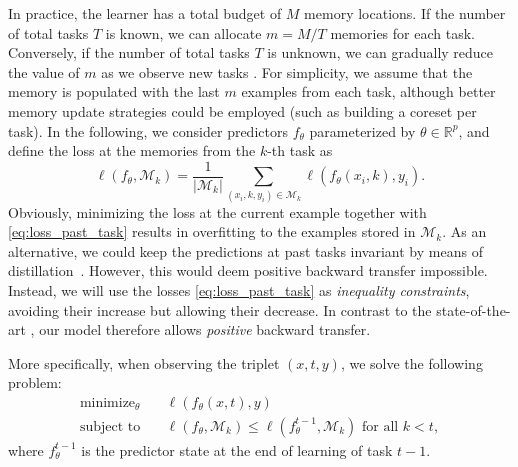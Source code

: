 \documentclass{article}
\begin{document}
In practice, the learner has a total budget of $M$ memory locations.  If the
number of total tasks $T$ is known, we can allocate $m=M/T$ memories for each
task.  Conversely, if the number of total tasks $T$ is unknown, we can
gradually reduce the value of $m$ as we observe new tasks \citep{icarl}.  For
simplicity, we assume that the memory is populated with the last $m$ examples
from each task, although better memory update strategies could be employed
(such as building a coreset per task).  In the following, we consider
predictors $f_\theta$ parameterized by $\theta \in \mathbb{R}^p$, and define
the loss at the memories from the $k$-th task as
\begin{equation}
  \ell(f_\theta, \mathcal{M}_k) = \frac{1}{|\mathcal{M}_k|} \sum_{(x_i, k, y_i)
  \in \mathcal{M}_k} \ell(f_\theta(x_i, k), y_i). \label{eq:loss_past_task}
\end{equation}
Obviously, minimizing the loss at the current example together with
\eqref{eq:loss_past_task} results in overfitting to the examples stored in
$\mathcal{M}_k$.  As an alternative, we could keep the predictions at past
tasks invariant by means of distillation~\citep{icarl}.  However, this would
deem positive backward transfer impossible.  Instead, we will use the losses
\eqref{eq:loss_past_task} as {\em inequality constraints}, avoiding their
increase but allowing their decrease.  In contrast to the state-of-the-art
\citep{ewc, icarl}, our model therefore allows \textit{positive} backward
transfer.

More specifically, when observing the triplet $(x, t, y)$, we solve the
following problem:
\begin{align}
\text{minimize}_\theta\quad& \ell(f_\theta(x,t), y)\nonumber\\
\text{subject to}\quad& \ell(f_\theta, \mathcal{M}_{k}) \leq
\ell(f^{t-1}_{\theta}, \mathcal{M}_{k}) \mbox{ for all } k < t,
\label{eq:projgrad-batch}
\end{align}
where $f^{t-1}_{\theta}$ is the predictor state at the end of learning of task
$t-1$.
\end{document}
